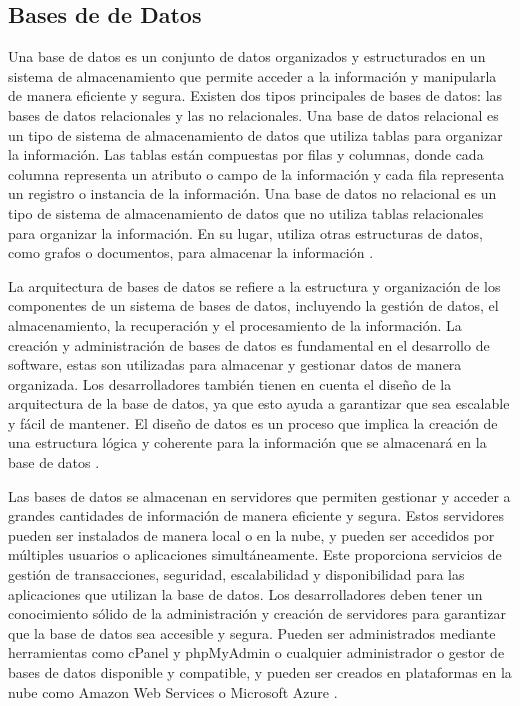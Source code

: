 \documentclass[runningheads]{llncs}
\begin{document}
\subsection{Bases de de Datos}
Una base de datos es un conjunto de datos organizados y estructurados en un sistema de almacenamiento que permite acceder a la información y manipularla de manera eficiente y segura. Existen dos tipos principales de bases de datos: las bases de datos relacionales y las no relacionales. Una base de datos relacional es un tipo de sistema de almacenamiento de datos que utiliza tablas para organizar la información. Las tablas están compuestas por filas y columnas, donde cada columna representa un atributo o campo de la información y cada fila representa un registro o instancia de la información. Una base de datos no relacional es un tipo de sistema de almacenamiento de datos que no utiliza tablas relacionales para organizar la información. En su lugar, utiliza otras estructuras de datos, como grafos o documentos, para almacenar la información \cite{Cita12}.

La arquitectura de bases de datos se refiere a la estructura y organización de los componentes de un sistema de bases de datos, incluyendo la gestión de datos, el almacenamiento, la recuperación y el procesamiento de la información. La creación y administración de bases de datos es fundamental en el desarrollo de software, estas son utilizadas para almacenar y gestionar datos de manera organizada. Los desarrolladores también tienen en cuenta el diseño de la arquitectura de la base de datos, ya que esto ayuda a garantizar que sea escalable y fácil de mantener. El diseño de datos es un proceso que implica la creación de una estructura lógica y coherente para la información que se almacenará en la base de datos \cite{Cita13}. 

Las bases de datos se almacenan en servidores que permiten gestionar y acceder a grandes cantidades de información de manera eficiente y segura. Estos servidores pueden ser instalados de manera local o en la nube, y pueden ser accedidos por múltiples usuarios o aplicaciones simultáneamente. Este proporciona servicios de gestión de transacciones, seguridad, escalabilidad y disponibilidad para las aplicaciones que utilizan la base de datos. Los desarrolladores deben tener un conocimiento sólido de la administración y creación de servidores para garantizar que la base de datos sea accesible y segura. Pueden ser administrados mediante herramientas como cPanel y phpMyAdmin o cualquier administrador o gestor de bases de datos disponible y compatible, y pueden ser creados en plataformas en la nube como Amazon Web Services o Microsoft Azure \cite{Cita14}.
\end{document}
